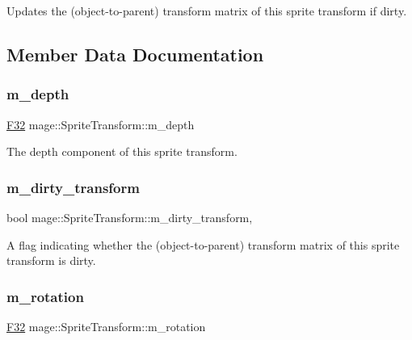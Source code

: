 Updates the (object-\/to-\/parent) transform matrix of this sprite transform if dirty. 

\subsection{Member Data Documentation}
\hypertarget{structmage_1_1_sprite_transform_a646e129b2e9702eec23b4c673f07dfef}{}\label{structmage_1_1_sprite_transform_a646e129b2e9702eec23b4c673f07dfef} 
\subsubsection{\texorpdfstring{m\+\_\+depth}{m\_depth}}
{\footnotesize\ttfamily \hyperlink{namespacemage_aa97e833b45f06d60a0a9c4fc22ae02c0}{F32} mage\+::\+Sprite\+Transform\+::m\+\_\+depth\hspace{0.3cm}{\ttfamily [private]}}

The depth component of this sprite transform. \hypertarget{structmage_1_1_sprite_transform_a3072ed606f16d14d16cdad46438e9cf3}{}\label{structmage_1_1_sprite_transform_a3072ed606f16d14d16cdad46438e9cf3} 
\subsubsection{\texorpdfstring{m\+\_\+dirty\+\_\+transform}{m\_dirty\_transform}}
{\footnotesize\ttfamily bool mage\+::\+Sprite\+Transform\+::m\+\_\+dirty\+\_\+transform\hspace{0.3cm}{\ttfamily [mutable]}, {\ttfamily [private]}}

A flag indicating whether the (object-\/to-\/parent) transform matrix of this sprite transform is dirty. \hypertarget{structmage_1_1_sprite_transform_a7c705543e7f6a9c7e7a517ffef2cb4b9}{}\label{structmage_1_1_sprite_transform_a7c705543e7f6a9c7e7a517ffef2cb4b9} 
\subsubsection{\texorpdfstring{m\+\_\+rotation}{m\_rotation}}
{\footnotesize\ttfamily \hyperlink{namespacemage_aa97e833b45f06d60a0a9c4fc22ae02c0}{F32} mage\+::\+Sprite\+Transform\+::m\+\_\+rotation\hspace{0.3cm}{\ttfamily [private]}}

